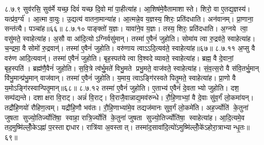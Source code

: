 ८.७.९
सुव॑रसि॒ सुव॑र्मे यच्छ॒ दिवं॑ यच्छ दि॒वो मा॑ पा॒हीत्या॑ह। आ॒शिष॑मे॒वैतामाशास्ते। शिरो॒ वा ए॒तद्य॒ज्ञस्य॑। यत्प्र॑व॒र्ग्य॑। आ॒त्मा वा॒युः। उ॒द्यत्य॑ वातना॒मान्या॑ह। आ॒त्मन्ने॒व य॒ज्ञस्य॒ शिरः॒ प्रति॑दधाति। अन॑वानम्। प्रा॒णाना॒ सन्त॑त्यै। पञ्चा॑ह॥६६॥
८.७.१०
पाङ्क्तो॑ य॒ज्ञः। यावा॑ने॒व य॒ज्ञः। तस्य॒ शिरः॒ प्रति॑दधाति। अ॒ग्नये त्वा॒ वसु॑मते॒ स्वाहेत्या॑ह। अ॒सौ वा आ॑दि॒त्योऽग्निर्वसु॑मान्। तस्मा॑ ए॒वैनं॑ जुहोति। सोमा॑य त्वा रु॒द्रव॑ते॒ स्वाहेत्या॑ह। च॒न्द्रमा॒ वै सोमो॑ रु॒द्रवान्॑। तस्मा॑ ए॒वैनं॑ जुहोति। वरु॑णाय त्वाऽऽदि॒त्यव॑ते॒ स्वाहेत्या॑ह॥६७॥
८.७.११
अ॒प्सु वै वरु॑ण आदि॒त्यवान्॑। तस्मा॑ ए॒वैनं॑ जुहोति। बृह॒स्पत॑ये त्वा वि॒श्वदेव्यावते॒ स्वाहेत्या॑ह। ब्रह्म॒ वै दे॒वानां॒ बृह॒स्पति॑। ब्रह्म॑णै॒वैनं॑ जुहोति। स॒वि॒त्रे त्व॑र्भु॒मते॑ विभु॒मते प्रभु॒मते॒ वाज॑वते॒ स्वाहेत्या॑ह। सं॒व॒त्स॒रो वै स॑वि॒तर्भु॒मान् वि॑भु॒मान्प्र॑भु॒मान् वाज॑वान्। तस्मा॑ ए॒वैनं॑ जुहोति। य॒माय॒ त्वाऽङ्गि॑रस्वते पितृ॒मते॒ स्वाहेत्या॑ह। प्रा॒णो वै य॒मोऽङ्गि॑रस्वान्पितृ॒मान्॥६८॥
८.७.१२
तस्मा॑ ए॒वैनं॑ जुहोति। ए॒ताभ्य॑ ए॒वैनं॑ दे॒वताभ्यो जुहोति। दश॒ सम्प॑द्यन्ते। दशाक्षरा वि॒राट्। अन्नं॑  वि॒राट्। वि॒राजै॒वान्नाद्य॒मव॑रुन्धे। रौ॒हि॒णाभ्यां॒ वै दे॒वाः सु॑व॒र्गं॑ लो॒कमा॑यन्। तद्रौ॑हि॒णयो॑ रौहिण॒त्वम्। यद्रौ॑हि॒णौ भव॑तः। रौ॒हि॒णाभ्या॑मे॒व तद्यज॑मानः सुव॒र्गं लो॒कमे॑ति। अह॒र्ज्योति॑ के॒तुना॑ जुषता सुज्यो॒तिर्ज्योति॑षा॒ स्वाहा॒ रात्रि॒र्ज्योति॑ के॒तुना॑ जुषता सुज्यो॒तिर्ज्योति॑षा॒ स्वाहेत्या॑ह। आ॒दि॒त्यमे॒व तद॒मुष्मि॑ल्लोँ॒केऽह्ना॑ प॒रस्ताद्दाधार। रात्रि॑या अ॒वस्तात्। तस्मा॑द॒सावा॑दि॒त्यो॑ऽमुष्मि॑ल्लोँ॒के॑ऽहोरा॒त्राभ्यान्धृ॒तः॥६९॥
\anuvakamend

